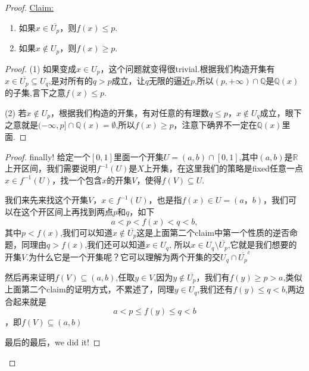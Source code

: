\documentclass{article}
\newenvironment{claim}[1]{\par\noindent\underline{Claim:}\space#1}{}
\begin{document}
\begin{proof}
\begin{claim}
\begin{enumerate}
	\item 如果$x \in \overline{U_p}$，则$f(x) \leq p$.
	\item 如果$x \notin U_p$，则$f(x) \geq p$.
\end{enumerate}
\end{claim}

\begin{proof}
(1) 如果变成$x \in {U_p}$，这个问题就变得很trivial.根据我们构造开集有$x \in \overline{U_p} \subseteq {U_q}$,是对所有的$q > p$成立，让$q$无限的逼近$p$,所以$(p,+\infty) \cap \mathbb{Q}$是$\mathbb{Q}(x)$的子集,言下之意$f(x) \leq p$.

(2) 若$x \notin U_p$，根据我们构造的开集，有对任意的有理数$q \leq p$，$x \notin U_q$成立，眼下之意就是$(-\infty,p] \cap \mathbb{Q}(x) = \emptyset$,所以$f(x) \geq p$，注意下确界不一定在$\mathbb{Q}(x)$里面.
\end{proof}


\begin{proof}
finally! 给定一个$[0,1]$里面一个开集$U=(a,b) \cap [0,1]$,其中$(a,b)$是$\mathbb{R}$上开区间，我们需要说明$f^{-1}(U)$是$X$上开集，在这里我们的策略是fixed任意一点$x \in f^{-1}(U)$，找一个包含$x$的开集$V$，使得$f(V) \subseteq U$. 

我们来先来找这个开集$V$，$x \in f^{-1}(U)$，也是指$f(x) \in U=(a，b)$，我们可以在这个开区间上再找到两点$p$和$q$，如下\[a < p < f(x) < q < b,\]其中$p < f(x)$,我们可以知道$x \notin \overline{U_p}$这是上面第二个claim中第一个性质的逆否命题，同理由$q > f(x)$,我们还可以知道$x \in U_q$, 所以$x \in U_q \setminus \overline{U_p}$,它就是我们想要的开集$V$.为什么它是一个开集呢？它可以理解为两个开集的交$U_q \cap \overline{U_p}^c$

然后再来证明$f(V) \subseteq (a,b)$,任取$y \in V$,因为$y \notin \overline{U_p}$，我们有$f(y) \geq p > a$,类似上面第二个claim的证明方式，不累述了，同理$ y \in U_q$,我们还有$f(y) \leq q < b$,两边合起来就是\[  a < p \leq f(y) \leq q < b\]，即$f(V) \subseteq (a,b)$

最后的最后，we did it!
\end{proof}

\end{proof}
\end{document}
